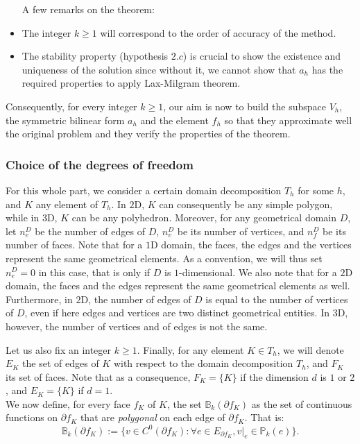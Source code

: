 \begin{remark}
\begin{itemize} A few remarks on the theorem:
\item The integer $k\geq 1$ will correspond to the order of accuracy of the method.
\item The stability property (hypothesis $2.c$) is crucial to show the existence and uniqueness of the solution since without it, we cannot show that $a_h$ has the required properties to apply Lax-Milgram theorem.
\end{itemize}
\end{remark}

Consequently, for every integer $k\geq 1$, our aim is now to build the subspace $V_h$, the symmetric bilinear form $a_h$ and the element $f_h$ so that they approximate well the original problem and they verify the properties of the theorem.

\subsubsection{Choice of the degrees of freedom}

For this whole part, we consider a certain domain decomposition $T_h$ for some $h$, and $K$ any element of $T_h$. In $2$D, $K$ can consequently be any simple polygon, while in $3$D, $K$ can be any polyhedron. Moreover, for any geometrical domain $D$, let $n_e^D$ be the number of edges of $D$, $n_v^D$ be its number of vertices, and $n_f^D$ be its number of faces. Note that for a $1$D domain, the faces, the edges and the vertices represent the same geometrical elements. As a convention, we will thus set $n_e^D = 0$ in this case, that is only if $D$ is $1$-dimensional. We also note that for a $2$D domain, the faces and the edges represent the same geometrical elements as well. Furthermore, in $2$D, the number of edges of $D$ is equal to the number of vertices of $D$, even if here edges and vertices are two distinct geometrical entities. In $3$D, however, the number of vertices and of edges is not the same.

Let us also fix an integer $k\geq 1$. Finally, for any element $K\in T_h$, we will denote $E_K$ the set of edges of $K$ with respect to the domain decomposition $T_h$, and $F_K$ its set of faces. Note that as a consequence, $F_K=\{K\}$ if the dimension $d$ is $1$ or $2$, and $E_K=\{K\}$ if $d=1$. \\

We now define, for every face $f_K$ of $K$, the set $\mathbb{B}_k(\partial f_K)$ as the set of continuous functions on $\partial f_K$ that are \textit{polygonal} on each edge of $\partial f_K$. That is: 
$$ \mathbb{B}_k(\partial f_K) := \Big\{v\in C^0(\partial f_K): \forall e\in E_{\partial f_K}, v|_e \in \mathbb{P}_k(e)\Big\}.$$


